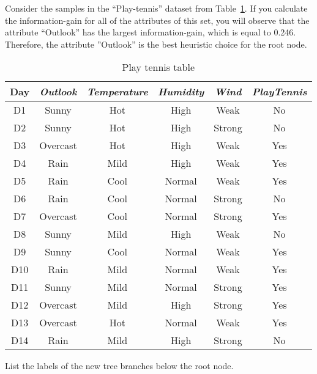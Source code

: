 \begin{problem}
  Consider the samples in the ``Play-tennis'' dataset from Table~\ref{tab:P02:PlayTennis}. If you calculate the information-gain for all of the attributes of this set, you will observe that the attribute “Outlook” has the largest information-gain, which is equal to 0.246. Therefore, the attribute ”Outlook” is the best heuristic choice for the root node.
\end{problem}

\begin{table}[h]
  \centering
  \caption{Play tennis table}\label{tab:P02:PlayTennis}
  \begin{tabular}{|c||c|c|c|c|c|}
    \hline
    \textbf{Day}  & \textit{Outlook}  & \textit{Temperature} & \textit{Humidity} & \textit{Wind} & \textit{PlayTennis} \\\hline\hline
    D1  & Sunny    & Hot   & High   & Weak   & No \\\hline
    D2  & Sunny    & Hot   & High   & Strong & No \\\hline
    D3  & Overcast & Hot   & High   & Weak   & Yes\\\hline
    D4  & Rain     & Mild  & High   & Weak   & Yes\\\hline
    D5  & Rain     & Cool  & Normal & Weak   & Yes\\\hline
    D6  & Rain     & Cool  & Normal & Strong & No \\\hline
    D7  & Overcast & Cool  & Normal & Strong & Yes\\\hline
    D8  & Sunny    & Mild  & High   & Weak   & No \\\hline
    D9  & Sunny    & Cool  & Normal & Weak   & Yes\\\hline
    D10 & Rain     & Mild  & Normal & Weak   & Yes\\\hline
    D11 & Sunny    & Mild  & Normal & Strong & Yes\\\hline
    D12 & Overcast & Mild  & High   & Strong & Yes\\\hline
    D13 & Overcast & Hot   & Normal & Weak   & Yes\\\hline
    D14 & Rain     & Mild  & High   & Strong & No \\\hline
  \end{tabular}
\end{table}

\begin{subproblem}
  List the labels of the new tree branches below the root node.
\end{subproblem}

